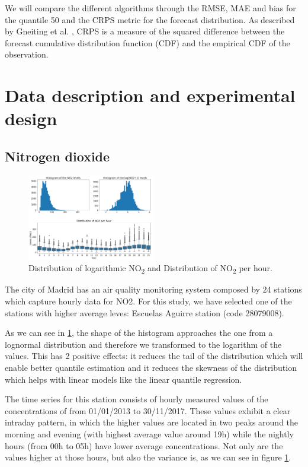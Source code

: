 \documentclass[a4paper,twocolumn,5p]{elsarticle}
\begin{document}
We will compare the different algorithms through the RMSE, MAE 
and bias for the quantile 50 and 
the CRPS metric for the forecast distribution.
As described by Gneiting et al. \cite{gneiting_probabilistic_2014},
CRPS is a measure of the squared difference between the 
forecast cumulative distribution function (CDF) 
and the empirical CDF of the observation.

\section{Data description and experimental design}

\subsection{Nitrogen dioxide}
\label{sec:no2}

\begin{figure}
  \centering
  \includegraphics[width=0.5\textwidth]{histo_variance}
  \caption{\label{figure:histo_variance}Distribution of logarithmic
    NO\textsubscript{2} and Distribution of NO\textsubscript{2}
    per hour.}
\end{figure}

The city of Madrid has an air quality monitoring system composed by 24
stations which capture hourly data for NO2.  For this study, we 
have selected one of
the stations with higher average leves: 
Escuelas Aguirre station (code
28079008).

As we can see in \ref{figure:histo_variance}, the shape of the histogram
approaches the one from a lognormal distribution and therefore we
transformed to the logarithm of the values. This has 2 positive
effects: it reduces the tail of the distribution which will enable
better quantile estimation and it reduces the skewness of the
distribution which helps with linear models like the linear quantile
regression.

The time series for this station consists of hourly measured values of
the concentrations of \no from 01/01/2013 to
30/11/2017. These values exhibit a clear intraday pattern, in which
the higher values are located in two peaks around the morning and
evening (with highest average value around 19h) while the nightly
hours (from 00h to 05h) have lower average concentrations.  Not only
are the values higher at those hours, but also the variance is, as we
can see in figure \ref{figure:histo_variance}.
 
\end{document}
